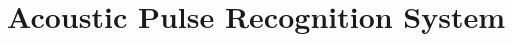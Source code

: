\chapter{Acoustic Pulse Recognition System}\label{ch:APR}

\ifpdf
    \graphicspath{{Chapter3_APR/Chapter3Figs/PNG/}{Chapter3_APR/Chapter3Figs/PDF/}{Chapter3_APR/Chapter3Figs/}}
\else
    \graphicspath{{Chapter3_APR/Chapter3Figs/EPS/}{Chapter3_APR/Chapter3Figs/}}
\fi




